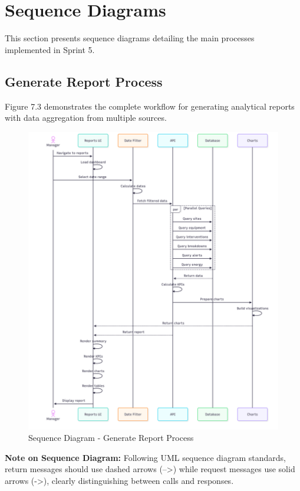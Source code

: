 \section{Sequence Diagrams}

This section presents sequence diagrams detailing the main processes implemented in Sprint 5.

\subsection{Generate Report Process}

Figure 7.3 demonstrates the complete workflow for generating analytical reports with data aggregation from multiple sources.

\begin{figure}[H]
    \centering
    \includegraphics[width=0.95\linewidth]{img/chap_07/sprint5_sequence_report.png}
    \caption{Sequence Diagram - Generate Report Process}
    \label{fig:sequence_generate_report}
\end{figure}

\textbf{Note on Sequence Diagram:} Following UML sequence diagram standards, return messages should use dashed arrows (-->) while request messages use solid arrows (->), clearly distinguishing between calls and responses.

